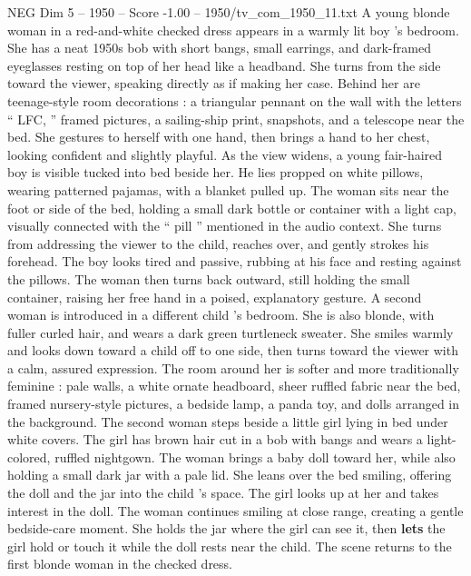 \begin{textsample}{NEG Dim 5 – 1950 – Score -1.00 – 1950/tv\_com\_1950\_11.txt}  \label{ex:f5_neg_026}
A young blonde woman in a red-and-white checked dress appears in a warmly lit boy ’s bedroom.
She has a neat 1950s bob with short bangs, small earrings, and dark-framed eyeglasses resting on top of her head like a headband.
She turns from the side toward the viewer, speaking directly as if making her case.
Behind her are teenage-style room decorations : a triangular pennant on the wall with the letters “ LFC, ” framed pictures, a sailing-ship print, snapshots, and a telescope near the bed.
She gestures to herself with one hand, then brings a hand to her chest, looking confident and slightly playful.
As the view widens, a young fair-haired boy is visible tucked into bed beside her.
He lies propped on white pillows, wearing patterned pajamas, with a blanket pulled up.
The woman sits near the foot or side of the bed, holding a small dark bottle or container with a light cap, visually connected with the “ pill ” mentioned in the audio context.
She turns from addressing the viewer to the child, reaches over, and gently strokes his forehead.
The boy looks tired and passive, rubbing at his face and resting against the pillows.
The woman then turns back outward, still holding the small container, raising her free hand in a poised, explanatory gesture.
A second woman is introduced in a different child ’s bedroom.
She is also blonde, with fuller curled hair, and wears a dark green turtleneck sweater.
She smiles warmly and looks down toward a child off to one side, then turns toward the viewer with a calm, assured expression.
The room around her is softer and more traditionally feminine : pale walls, a white ornate headboard, sheer ruffled fabric near the bed, framed nursery-style pictures, a bedside lamp, a panda toy, and dolls arranged in the background.
The second woman steps beside a little girl lying in bed under white covers.
The girl has brown hair cut in a bob with bangs and wears a light-colored, ruffled nightgown.
The woman brings a baby doll toward her, while also holding a small dark jar with a pale lid.
She leans over the bed smiling, offering the doll and the jar into the child ’s space.
The girl looks up at her and takes interest in the doll.
The woman continues smiling at close range, creating a gentle bedside-care moment.
She holds the jar where the girl can see it, then \textbf{lets} the girl hold or touch it while the doll rests near the child.
The scene returns to the first blonde woman in the checked dress.

\end{textsample}
